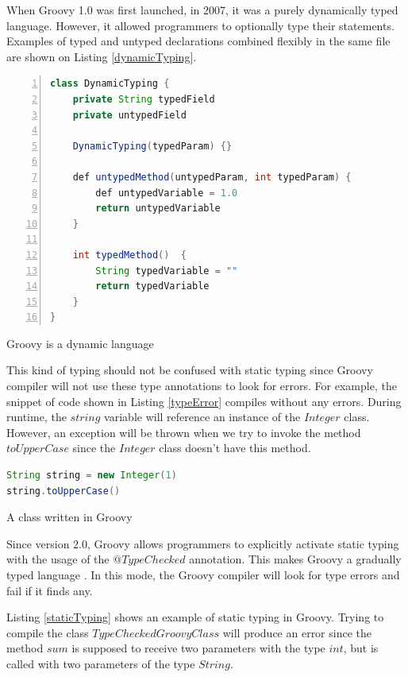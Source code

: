 \documentclass[preprint]{sigplanconf}
\begin{document}
When Groovy 1.0 was first launched, in 2007, it was a purely dynamically typed language.
However, it allowed programmers to optionally type their statements.
Examples of typed and untyped declarations combined flexibly in the same file are shown on Listing \ref{dynamicTyping}.


\begin{Listing}[ht]
\begin{lstlisting}[language=Java,tabsize=2,breaklines=true,numbers=left]
class DynamicTyping {
	private String typedField
	private untypedField

	DynamicTyping(typedParam) {}

	def untypedMethod(untypedParam, int typedParam) {
		def untypedVariable = 1.0
		return untypedVariable
	}

	int typedMethod()  {
		String typedVariable = ""
		return typedVariable
	}
}
\end{lstlisting}
\caption{Groovy is a dynamic language}
\label{dynamicTyping}
\end{Listing}

This kind of typing should not be confused with static typing since Groovy compiler will not use these type annotations to look for errors.
For example, the snippet of code shown in Listing \ref{typeError} compiles without any errors.
During runtime, the $string$ variable will reference an instance of the $Integer$ class.
However, an exception will be thrown when we try to invoke the method $toUpperCase$ since the $Integer$ class doesn't have this method.

\begin{Listing}[ht]
\begin{lstlisting}[language=Java,tabsize=2,breaklines=true]
String string = new Integer(1)
string.toUpperCase()
\end{lstlisting}
\caption{A class written in Groovy}
\label{typeError}
\end{Listing}

Since version 2.0, Groovy allows programmers to explicitly activate static typing with the usage of the $@TypeChecked$ annotation.
This makes Groovy a gradually typed language \cite{gray05,gray08,gray11,siek07,takikawa12}.
In this mode, the Groovy compiler will look for type errors and fail if it finds any.

Listing \ref{staticTyping} shows an example of static typing in Groovy.
Trying to compile the class $TypeCheckedGroovyClass$ will produce an error since the method $sum$ is supposed to receive two parameters with the type $int$, but is called with two parameters of the type $String$.
\end{document}
